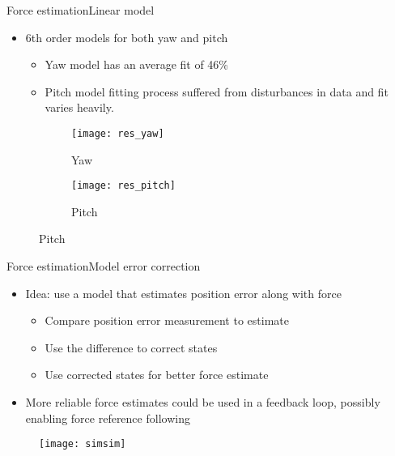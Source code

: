 \begin{frame}{Force estimation}{Linear model}
\begin{itemize}
\item 6th order models for both yaw and pitch
\begin{itemize}
\item Yaw model has an average fit of 46\%
\item Pitch model fitting process suffered from disturbances in data and fit varies heavily.
\end{itemize}
\end{itemize}
\begin{figure}
\centering
    \begin{subfigure}[t]{0.49\textwidth}
        \centering
        \texttt{[image: res\_yaw]} 
        \caption{Yaw} \label{fig:yawres}
    \end{subfigure}
        \begin{subfigure}[t]{0.49\textwidth}
        \centering
        \texttt{[image: res\_pitch]} 
        \caption{Pitch} \label{fig:pitchres}
    \end{subfigure}
\end{figure}
\end{frame}

\begin{frame}{Force estimation}{Model error correction}
\begin{itemize}
\item Idea: use a model that estimates position error along with force
\begin{itemize}
\item Compare position error measurement to estimate
\item Use the difference to correct states 
\item Use corrected states for better force estimate
\end{itemize}
\item More reliable force estimates could be used in a feedback loop, possibly enabling force reference following
\end{itemize}
\begin{figure}
\centering
\texttt{[image: simsim]}
\end{figure}
\end{frame}

